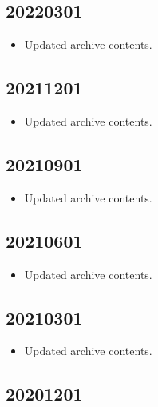 \documentclass[hidelinks,a4paper,12pt]{article}
\begin{document}
\subsection{20220301}  \label{sec:changelog_20220301}

\begin{itemize}
\item Updated archive contents.
\end{itemize}

\subsection{20211201}  \label{sec:changelog_20211201}

\begin{itemize}
\item Updated archive contents.
\end{itemize}

\subsection{20210901}  \label{sec:changelog_20210901}

\begin{itemize}
\item Updated archive contents.
\end{itemize}

\subsection{20210601}  \label{sec:changelog_20210601}

\begin{itemize}
\item Updated archive contents.
\end{itemize}

\subsection{20210301}  \label{sec:changelog_20210301}

\begin{itemize}
\item Updated archive contents.
\end{itemize}

\subsection{20201201}  \label{sec:changelog_20201201}
\end{document}

